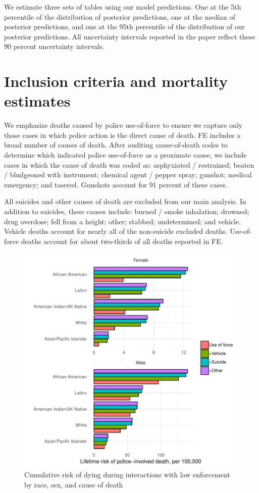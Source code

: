 \documentclass{article}
\begin{document}
We estimate three sets of tables using our model predictions. One at the 5th percentile of the distribution of posterior predictions, one at the median of posterior predictions, and one at the 95th percentile of the distribution of our posterior predictions. All uncertainty intervals reported in the paper reflect these 90 percent uncertainty intervals. 

\section*{Inclusion criteria and mortality estimates}

We emphasize deaths caused by police use-of-force to ensure we capture only those cases in which police action is the direct cause of death. FE includes a broad number of causes of death. After auditing cause-of-death codes to determine which indicated police use-of-force as a proximate cause, we include cases in which the cause of death was coded as: asphyxiated / restrained; beaten / bludgeoned with instrument; chemical agent / pepper spray; gunshot; medical emergency; and tasered. Gunshots account for 91 percent of these cases.

All suicides and other causes of death are excluded from our main analysis. In addition to suicides, these causes include: burned / smoke inhalation; drowned; drug overdose; fell from a height; other; stabbed; undetermined; and vehicle. Vehicle deaths account for nearly all of the non-suicide excluded deaths. Use-of-force deaths account for about two-thirds of all deaths reported in FE. 

\begin{figure}
	\includegraphics[width=\linewidth]{vis/death_type_c_new.pdf}
	\caption{Cumulative risk of dying during interactions with law enforcement by race, sex, and cause of death}
	\label{fig:death_type}
\end{figure}
\end{document}
